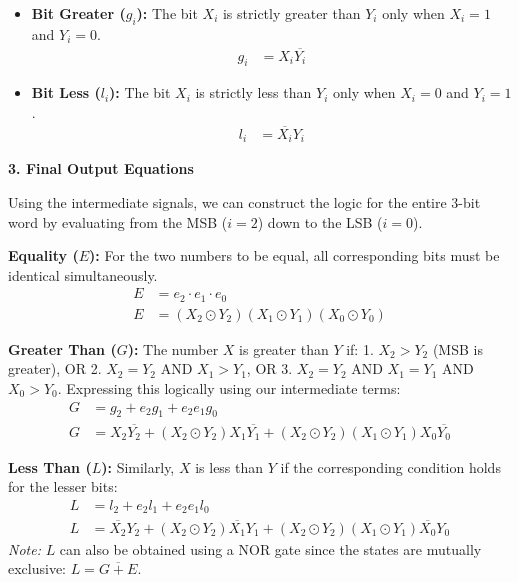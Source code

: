 \documentclass[12pt,a3paper]{article}
\begin{document}
\begin{enumerate}
\begin{tcolorbox}[enhanced,breakable,ansbox,colback=cD!4,colframe=cD,boxrule=0.8pt,arc=5pt,title={\textbf{Answer}},fonttitle=\bfseries\color{white},colbacktitle=cD]
\begin{itemize}
    \item \textbf{Bit Greater ($g_i$):} The bit $X_i$ is strictly greater than $Y_i$ only when $X_i = 1$ and $Y_i = 0$. 
    \begin{align*}
        g_i &= X_i \overline{Y_i}
    \end{align*}
    
    \item \textbf{Bit Less ($l_i$):} The bit $X_i$ is strictly less than $Y_i$ only when $X_i = 0$ and $Y_i = 1$.
    \begin{align*}
        l_i &= \overline{X_i} Y_i
    \end{align*}
\end{itemize}

\vspace{1em}
\textbf{3. Final Output Equations}

Using the intermediate signals, we can construct the logic for the entire 3-bit word by evaluating from the MSB ($i=2$) down to the LSB ($i=0$).

\textbf{Equality ($E$):}
For the two numbers to be equal, all corresponding bits must be identical simultaneously.
\begin{align*}
    E &= e_2 \cdot e_1 \cdot e_0 \\
    E &= (X_2 \odot Y_2)(X_1 \odot Y_1)(X_0 \odot Y_0)
\end{align*}

\textbf{Greater Than ($G$):}
The number $X$ is greater than $Y$ if:
1. $X_2 > Y_2$ (MSB is greater), OR
2. $X_2 = Y_2$ AND $X_1 > Y_1$, OR
3. $X_2 = Y_2$ AND $X_1 = Y_1$ AND $X_0 > Y_0$.
Expressing this logically using our intermediate terms:
\begin{align*}
    G &= g_2 + e_2 g_1 + e_2 e_1 g_0 \\
    G &= X_2 \overline{Y_2} + (X_2 \odot Y_2)X_1 \overline{Y_1} + (X_2 \odot Y_2)(X_1 \odot Y_1)X_0 \overline{Y_0}
\end{align*}

\textbf{Less Than ($L$):}
Similarly, $X$ is less than $Y$ if the corresponding condition holds for the lesser bits:
\begin{align*}
    L &= l_2 + e_2 l_1 + e_2 e_1 l_0 \\
    L &= \overline{X_2} Y_2 + (X_2 \odot Y_2)\overline{X_1} Y_1 + (X_2 \odot Y_2)(X_1 \odot Y_1)\overline{X_0} Y_0
\end{align*}
\textit{Note:} $L$ can also be obtained using a NOR gate since the states are mutually exclusive: $L = \overline{G + E}$.


\end{tcolorbox}
\end{enumerate}
\end{document}
